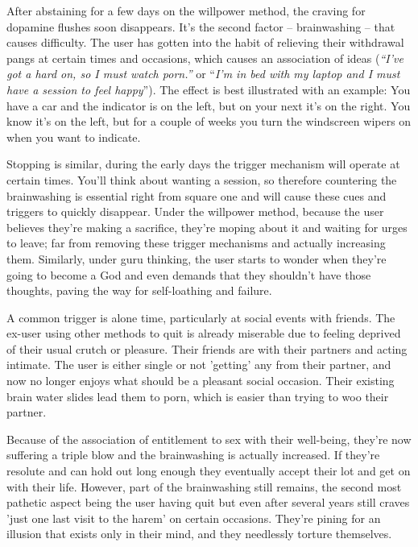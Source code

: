 \documentclass[
]{book}
\begin{document}
After abstaining for a few days on the willpower method, the craving for dopamine flushes soon disappears. It's the second factor -- brainwashing -- that causes difficulty. The user has gotten into the habit of relieving their withdrawal pangs at certain times and occasions, which causes an association of ideas (\emph{``I've got a hard on, so I must watch porn.''} or ``\emph{I'm in bed with my laptop and I must have a session to feel happy}''). The effect is best illustrated with an example: You have a car and the indicator is on the left, but on your next it's on the right. You know it's on the left, but for a couple of weeks you turn the windscreen wipers on when you want to indicate.

Stopping is similar, during the early days the trigger mechanism will operate at certain times. You'll think about wanting a session, so therefore countering the brainwashing is essential right from square one and will cause these cues and triggers to quickly disappear. Under the willpower method, because the user believes they're making a sacrifice, they're moping about it and waiting for urges to leave; far from removing these trigger mechanisms and actually increasing them. Similarly, under guru thinking, the user starts to wonder when they're going to become a God and even demands that they shouldn't have those thoughts, paving the way for self-loathing and failure.

A common trigger is alone time, particularly at social events with friends. The ex-user using other methods to quit is already miserable due to feeling deprived of their usual crutch or pleasure. Their friends are with their partners and acting intimate. The user is either single or not 'getting' any from their partner, and now no longer enjoys what should be a pleasant social occasion. Their existing brain water slides lead them to porn, which is easier than trying to woo their partner.

Because of the association of entitlement to sex with their well-being, they're now suffering a triple blow and the brainwashing is actually increased. If they're resolute and can hold out long enough they eventually accept their lot and get on with their life. However, part of the brainwashing still remains, the second most pathetic aspect being the user having quit but even after several years still craves 'just one last visit to the harem' on certain occasions. They're pining for an illusion that exists only in their mind, and they needlessly torture themselves.
\end{document}

